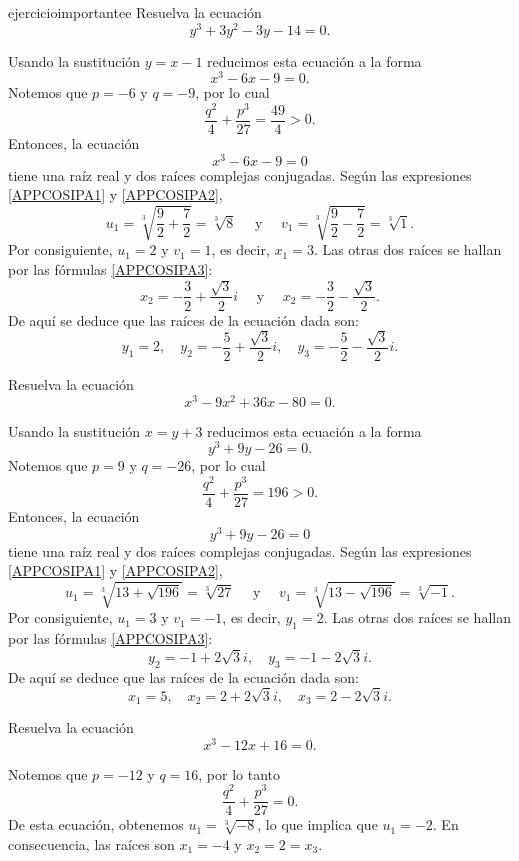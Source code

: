 \begin{examplebox}{}{ejercicioimportantee}
    Resuelva la ecuación
    $$y^3+3y^2-3y-14=0.$$

    \tcblower
    \solucion Usando la sustitución $y=x-1$ reducimos esta ecuación a la forma
    $$x^3-6x-9=0.$$
    Notemos que $p=-6$ y $q=-9$, por lo cual
    $$\frac{q^2}{4}+\frac{p^3}{27}=\frac{49}{4}>0.$$
    Entonces, la ecuación
    $$x^3-6x-9=0$$
    tiene una raíz real y dos raíces complejas conjugadas. Según las expresiones \eqref{APPCOSIPA1} y \eqref{APPCOSIPA2},
    $$u_1=\sqrt[3]{\frac{9}{2}+\frac{7}{2}}=\sqrt[3]{8} \quad \text{ y } \quad v_1=\sqrt[3]{\frac{9}{2}-\frac{7}{2}}=\sqrt[3]{1}.$$
    Por consiguiente, $u_1=2$ y $v_1=1$, es decir, $x_1=3$. Las otras dos raíces se hallan por las fórmulas \eqref{APPCOSIPA3}:
    $$x_2 = - \frac{3}{2} + \frac{\sqrt{3}}{2}i \quad \text{ y } \quad x_2 = - \frac{3}{2} - \frac{\sqrt{3}}{2}.$$
    De aquí se deduce que las raíces de la ecuación dada son:
    $$y_1 = 2, \quad y_2 = - \frac{5}{2} + \frac{\sqrt{3}}{2}i, \quad y_3 = - \frac{5}{2} - \frac{\sqrt{3}}{2}i.$$
\end{examplebox}

\begin{examplebox}{}{}
    Resuelva la ecuación
    $$x^3 - 9x^2 + 36x - 80 = 0.$$

    \tcblower
    \solucion Usando la sustitución $x = y + 3$ reducimos esta ecuación a la forma
    $$y^3 + 9y - 26 = 0.$$
    Notemos que $p=9$ y $q=-26$, por lo cual
    $$\frac{q^2}{4}+\frac{p^3}{27}=196>0.$$
    Entonces, la ecuación
    $$y^3 + 9y - 26 = 0$$
    tiene una raíz real y dos raíces complejas conjugadas. Según las expresiones \eqref{APPCOSIPA1} y \eqref{APPCOSIPA2},
    $$u_1=\sqrt[3]{13 + \sqrt{196}}=\sqrt[3]{27} \quad \text{ y } \quad v_1=\sqrt[3]{13 - \sqrt{196}}=\sqrt[3]{-1}.$$
    Por consiguiente, $u_1=3$ y $v_1=-1$, es decir, $y_1=2$. Las otras dos raíces se hallan por las fórmulas \eqref{APPCOSIPA3}:
    $$y_2=-1+2\sqrt{3}i, \quad y_3=-1-2\sqrt{3}i.$$
    De aquí se deduce que las raíces de la ecuación dada son:
    $$x_1=5, \quad x_2=2+2\sqrt{3}i, \quad x_3=2-2\sqrt{3}i.$$
\end{examplebox}

\newpage

\begin{examplebox}{}{}
    Resuelva la ecuación
    $$x^3-12x+16=0.$$

    \tcblower
    \solucion Notemos que $p=-12$ y $q=16$, por lo tanto
    $$\frac{q^2}{4}+\frac{p^3}{27}=0.$$
    De esta ecuación, obtenemos $u_1=\sqrt[3]{-8}$, lo que implica que $u_1=-2$. En consecuencia, las raíces son $x_1=-4$ y $x_2=2=x_3$.
\end{examplebox}

